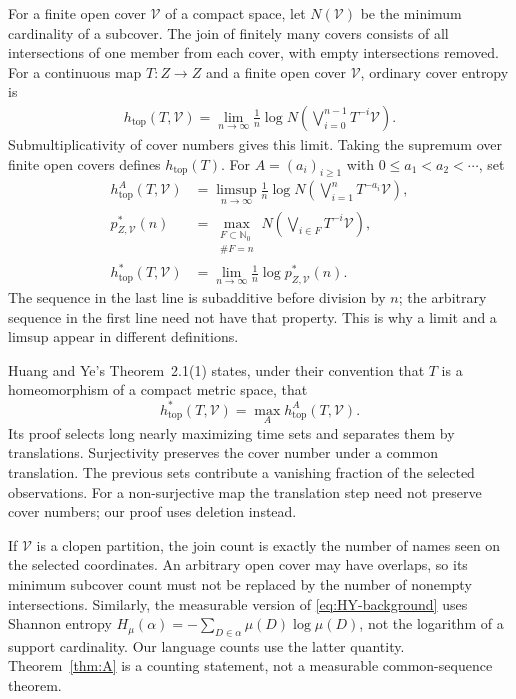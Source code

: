 \documentclass[11pt,reqno]{amsart}
\numberwithin{equation}{section}
\theoremstyle{definition}
\begin{document}
For a finite open cover $\mathcal V$ of a compact space,
let $N(\mathcal V)$ be the minimum
cardinality of a subcover. The join of finitely many covers consists of
all intersections of one member from each cover, with empty intersections
removed. For a continuous map $T:Z\to Z$ and a finite open cover
$\mathcal V$, ordinary cover entropy is
\begin{align*}
 h_{\mathrm{top}}(T,\mathcal V)
 =\lim_{n\to\infty}\frac1n\log N\left(
 \bigvee_{i=0}^{n-1}T^{-i}\mathcal V\right).
\end{align*}
Submultiplicativity of cover numbers gives this limit. Taking the
supremum over finite open covers defines $h_{\mathrm{top}}(T)$.
For $A=(a_i)_{i\ge1}$ with $0\le a_1<a_2<\cdots$, set
\begin{align*}
 h_{\mathrm{top}}^A(T,\mathcal V)
 &=\limsup_{n\to\infty}\frac1n\log N\left(
     \bigvee_{i=1}^nT^{-a_i}\mathcal V\right),\\
 p_{Z,\mathcal V}^*(n)
 &=\max_{\substack{F\subset\mathbb N_0\\\#F=n}}
    N\left(\bigvee_{i\in F}T^{-i}\mathcal V\right),\\
 h_{\mathrm{top}}^*(T,\mathcal V)
 &=\lim_{n\to\infty}\frac1n\log p_{Z,\mathcal V}^*(n).
\end{align*}
The sequence in the last line is subadditive before division by $n$;
the arbitrary sequence in the first line need not have that property.
This is why a limit and a limsup appear in different definitions.

Huang and Ye's Theorem~2.1(1) states, under their convention that $T$ is a
homeomorphism of a compact metric space, that
\begin{equation}\label{eq:HY-background}
 h_{\mathrm{top}}^*(T,\mathcal V)
 =\max_A h_{\mathrm{top}}^A(T,\mathcal V).
\end{equation}
Its proof selects long nearly maximizing time sets and separates them
by translations. Surjectivity preserves the cover number under a common
translation. The previous sets contribute a vanishing fraction of the
selected observations. For a non-surjective map the translation step
need not preserve cover numbers; our proof uses deletion instead.

If $\mathcal V$ is a clopen partition, the join count is exactly the
number of names seen on the selected coordinates. An arbitrary open
cover may have overlaps, so its minimum subcover count must not be
replaced by the number of nonempty intersections. Similarly, the
measurable version of \eqref{eq:HY-background} uses Shannon entropy
$H_\mu(\alpha)=-\sum_{D\in\alpha}\mu(D)\log\mu(D)$, not the logarithm
of a support cardinality. Our language counts use the latter quantity.
Theorem~\ref{thm:A} is a counting statement, not a measurable
common-sequence theorem.
\end{document}
